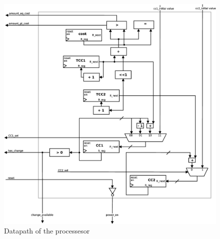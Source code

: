 \begin{figure}
\centering
\includegraphics[width=1.0\textwidth]{fig/datapath.eps}
\caption{Datapath of the processesor}
\label{fig:datapath}
\end{figure}
